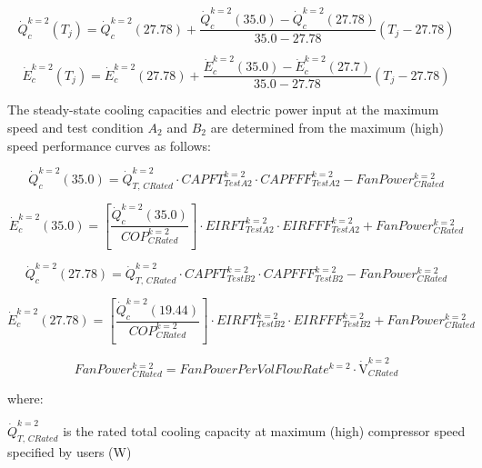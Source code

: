\begin{equation}
\dot Q_c^{k = 2}({T_j}) = \dot Q_c^{k = 2}(27.78) + \frac{{\dot Q_c^{k = 2}(35.0) - \dot Q_c^{k = 2}(27.78)}}{{35.0 - 27.78}}\left( {{T_j} - 27.78} \right)
\end{equation}

\begin{equation}
\dot E_c^{k = 2}({T_j}) = \dot E_c^{k = 2}(27.78) + \frac{{\dot E_c^{k = 2}(35.0) - \dot E_c^{k = 2}(27.7)}}{{35.0 - 27.78}}\left( {{T_j} - 27.78} \right)
\end{equation}

The steady-state cooling capacities and electric power input at the maximum speed and test condition \(A_{2}\) and \(B_{2}\) are determined from the maximum (high) speed performance curves as follows:

\begin{equation}
\dot Q_c^{k = 2}(35.0) = \dot Q_{T,\,CRated}^{k = 2} \cdot CAPFT_{TestA2}^{k = 2} \cdot CAPFFF_{TestA2}^{k = 2} - FanPower_{CRated}^{k = 2}
\end{equation}

\begin{equation}
\dot E_c^{k = 2}(35.0) = \left[ {\frac{{\dot Q_c^{k = 2}(35.0)}}{{COP_{CRated}^{k = 2}}}} \right] \cdot EIRFT_{TestA2}^{k = 2} \cdot EIRFFF_{TestA2}^{k = 2} + FanPower_{CRated}^{k = 2}
\end{equation}

\begin{equation}
  \dot Q_c^{k = 2}(27.78) = \dot Q_{T,\,CRated}^{k = 2} \cdot CAPFT_{TestB2}^{k = 2} \cdot CAPFFF_{TestB2}^{k = 2} - FanPower_{CRated}^{k = 2}
\end{equation}

\begin{equation}
  \dot E_c^{k = 2}(27.78) = \left[ {\frac{{\dot Q_c^{k = 2}(19.44)}}{{COP_{CRated}^{k = 2}}}} \right] \cdot EIRFT_{TestB2}^{k = 2} \cdot EIRFFF_{TestB2}^{k = 2} + FanPower_{CRated}^{k = 2}
\end{equation}

\begin{equation}
  FanPower_{CRated}^{k = 2} = FanPowerPerVolFlowRat{e^{k = 2}} \cdot {\mathrm{\dot V}}_{CRated}^{k = 2}
\end{equation}

where:

\(\dot Q_{T,\,CRated}^{k = 2}\) is the rated total cooling capacity at maximum (high) compressor speed specified by users (W)

